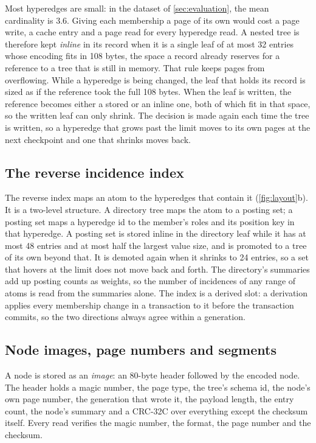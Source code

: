 Most hyperedges are small: in the dataset of \cref{sec:evaluation}, the mean cardinality is 3.6. Giving each membership a page of its own would cost a page write, a cache entry and a page read for every hyperedge read. A nested tree is therefore kept \emph{inline} in its record when it is a single leaf of at most 32 entries whose encoding fits in 108 bytes, the space a record already reserves for a reference to a tree that is still in memory. That rule keeps pages from overflowing. While a hyperedge is being changed, the leaf that holds its record is sized as if the reference took the full 108 bytes. When the leaf is written, the reference becomes either a stored or an inline one, both of which fit in that space, so the written leaf can only shrink. The decision is made again each time the tree is written, so a hyperedge that grows past the limit moves to its own pages at the next checkpoint and one that shrinks moves back.

\subsection{The reverse incidence index}

The reverse index maps an atom to the hyperedges that contain it (\cref{fig:layout}b). It is a two-level structure. A directory tree maps the atom to a posting set; a posting set maps a hyperedge id to the member's roles and its position key in that hyperedge. A posting set is stored inline in the directory leaf while it has at most 48 entries and at most half the largest value size, and is promoted to a tree of its own beyond that. It is demoted again when it shrinks to 24 entries, so a set that hovers at the limit does not move back and forth. The directory's summaries add up posting counts as weights, so the number of incidences of any range of atoms is read from the summaries alone. The index is a derived slot: a derivation applies every membership change in a transaction to it before the transaction commits, so the two directions always agree within a generation.

\subsection{Node images, page numbers and segments}
\label{sec:pages}

A node is stored as an \emph{image}: an 80-byte header followed by the encoded node. The header holds a magic number, the page type, the tree's schema id, the node's own page number, the generation that wrote it, the payload length, the entry count, the node's summary and a CRC-32C over everything except the checksum itself. Every read verifies the magic number, the format, the page number and the checksum.

